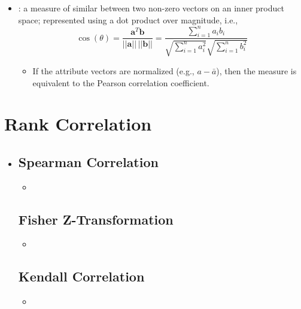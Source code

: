 \begin{itemize}
  \item {}: a measure of similar between two non-zero vectors on an inner product space; represented using a dot product over magnitude, i.e.,
  \[%
  \cos(\theta) = \frac{\bm{a}^T \bm{b}}{||\bm{a}||\,||\bm{b}||}= \frac{\sum_{i = 1}^{n}a_i b_i}{\sqrt{\sum_{i = 1}^{n}a^2_i}\sqrt{\sum_{i = 1}^{n}b^2_i}}
  \]%
    \begin{itemize}
      \item If the attribute vectors are normalized (e.g., \(a-\bar{a}\)), then the measure is equivalent to the Pearson correlation coefficient.
    \end{itemize}
  
\end{itemize}


\section{Rank Correlation}
\begin{itemize}
  \item []
  
  \subsection{Spearman Correlation}
  \begin{itemize}
    \item 
  \end{itemize}

  \subsection{Fisher Z-Transformation}
  \begin{itemize}
    \item 
  \end{itemize}

  \subsection{Kendall Correlation}
  \begin{itemize}
    \item 
  \end{itemize}

\end{itemize}

